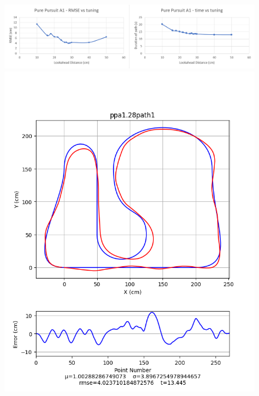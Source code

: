 \documentclass[mla8alt]{mla}
\begin{document}
\begin{paper}
\begin{figure}[H]
\includegraphics[width=\linewidth]{tuningGraphs/ppa1}
\includegraphics[width=\linewidth]{pathData/ppa1path1}
\endminipage\hfill
{}

\end{figure}
\end{paper}
\end{document}

